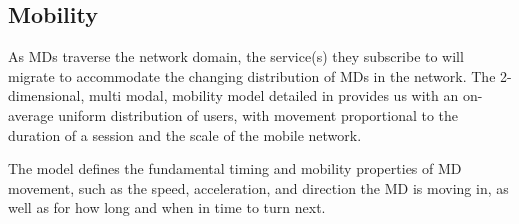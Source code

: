 \subsection{Mobility}
As \ac{MD}s traverse the \xcloud{} network domain, the service(s) they subscribe to will migrate to accommodate the changing distribution of \ac{MD}s in the network. The 2-dimensional, multi modal, mobility model detailed in \cite{bettstetter2001smooth} provides us with an on-average uniform distribution of users, with movement proportional to the duration of a session and the scale of the mobile network.

The model defines the fundamental timing and mobility properties of \ac{MD} movement, such as the speed, acceleration, and direction the \ac{MD} is moving in, as well as for how long and when in time to turn next. 